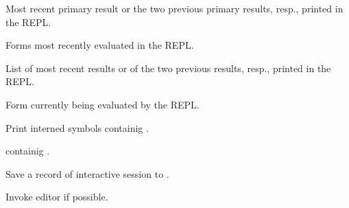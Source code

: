 \begin{LIST}{1cm}
  
  \IT{\Goo{\kwd*{*}\XOR\kwd*{**}\XOR\V*{***}}}
  Most recent primary result or the two previous primary results,
  resp., printed in the REPL. 
  
  \IT{\Goo{\kwd*{+}\XOR\kwd*{++}\XOR\V*{+++}}}
  Forms most recently evaluated in the REPL.
  
  \IT{\Goo{\kwd*{/}\XOR\kwd*{//}\XOR\V*{///}}}
  List of most recent results or of the two previous results, resp., printed in the REPL.
  
  \IT{\kwd*{--}}
  Form currently being evaluated by the REPL.

  Print interned symbols containig .

   containig .

  Save a record of interactive session to .

  Invoke editor if possible.

\end{LIST}


